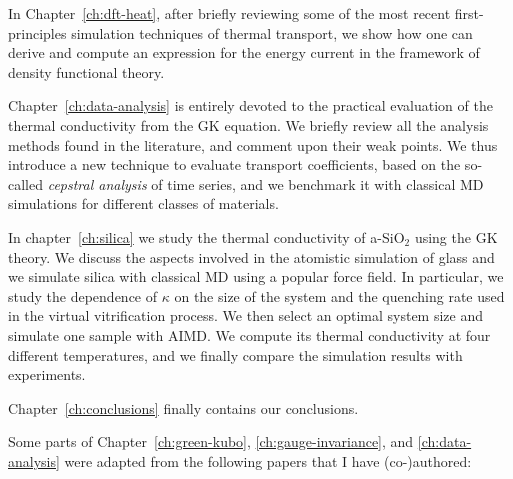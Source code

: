 In Chapter~\ref{ch:dft-heat}, after briefly reviewing some of the most recent first-principles simulation techniques of thermal transport, we show how one can derive and compute an \abinitio expression for the energy current in the framework of density functional theory. 

Chapter~\ref{ch:data-analysis} is entirely devoted to the practical evaluation of the thermal conductivity from the GK equation. We briefly review all the analysis methods found in the literature, and comment upon their weak points. 
We thus introduce a new technique to evaluate transport coefficients, based on the so-called \emph{cepstral analysis} of time series, and we benchmark it with classical MD simulations for different classes of materials.

In chapter~\ref{ch:silica} we study the thermal conductivity of a-SiO$_2$ using the \abinitio GK theory. 
We discuss the aspects involved in the atomistic simulation of glass and we simulate silica with classical MD using a popular force field. In particular, we study the dependence of $\kappa$ on the size of the system and the quenching rate used in the virtual vitrification process. 
We then select an optimal system size and simulate one sample with AIMD. 
We compute its thermal conductivity at four different temperatures, and we finally compare the simulation results with experiments. 

Chapter~\ref{ch:conclusions} finally contains our conclusions.

\smallskip
Some parts of Chapter~\ref{ch:green-kubo}, \ref{ch:gauge-invariance}, and \ref{ch:data-analysis} were adapted from the following papers that I have (co-)authored:







